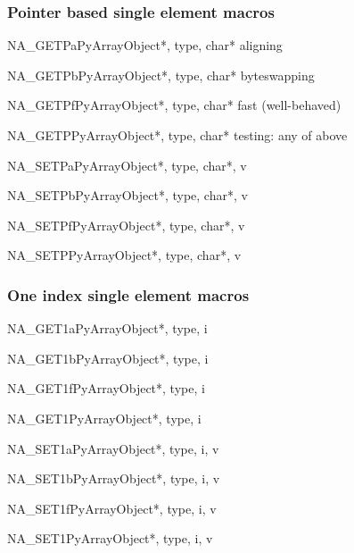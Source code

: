 \subsubsection{Pointer based single element macros}
\label{sec:C-API:pointer-based-single}

\begin{cfuncdesc}{}{NA_GETPa}{PyArrayObject*, type, char*}
   aligning
\end{cfuncdesc}
\begin{cfuncdesc}{}{NA_GETPb}{PyArrayObject*, type, char*}
   byteswapping
\end{cfuncdesc}
\begin{cfuncdesc}{}{NA_GETPf}{PyArrayObject*, type, char*}
   fast (well-behaved)
\end{cfuncdesc}
\begin{cfuncdesc}{}{NA_GETP}{PyArrayObject*,  type, char*}
   testing: any of above
\end{cfuncdesc}
\begin{cfuncdesc}{}{NA_SETPa}{PyArrayObject*, type, char*, v}
\end{cfuncdesc}
\begin{cfuncdesc}{}{NA_SETPb}{PyArrayObject*, type, char*, v}
\end{cfuncdesc}
\begin{cfuncdesc}{}{NA_SETPf}{PyArrayObject*, type, char*, v}
\end{cfuncdesc}
\begin{cfuncdesc}{}{NA_SETP}{PyArrayObject*,  type, char*, v}
\end{cfuncdesc}

\subsubsection{One index single element macros}
\begin{cfuncdesc}{}{NA_GET1a}{PyArrayObject*, type, i}
\end{cfuncdesc}
\begin{cfuncdesc}{}{NA_GET1b}{PyArrayObject*, type, i}
\end{cfuncdesc}
\begin{cfuncdesc}{}{NA_GET1f}{PyArrayObject*, type, i}
\end{cfuncdesc}
\begin{cfuncdesc}{}{NA_GET1}{PyArrayObject*,  type, i}
\end{cfuncdesc}
\begin{cfuncdesc}{}{NA_SET1a}{PyArrayObject*, type, i, v}
\end{cfuncdesc}
\begin{cfuncdesc}{}{NA_SET1b}{PyArrayObject*, type, i, v}
\end{cfuncdesc}
\begin{cfuncdesc}{}{NA_SET1f}{PyArrayObject*, type, i, v}
\end{cfuncdesc}
\begin{cfuncdesc}{}{NA_SET1}{PyArrayObject*,  type, i, v}
\end{cfuncdesc}

